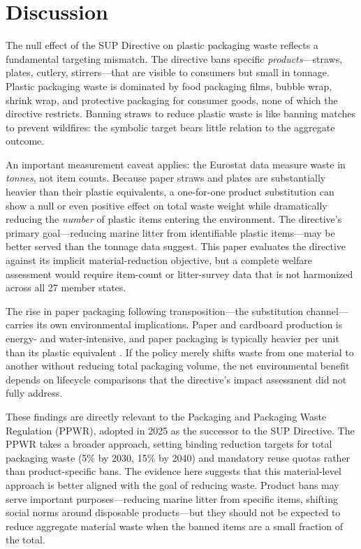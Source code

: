 \documentclass[12pt]{article}
\begin{document}



\section{Discussion}
\label{sec:discussion}

The null effect of the SUP Directive on plastic packaging waste reflects a fundamental targeting mismatch. The directive bans specific \textit{products}---straws, plates, cutlery, stirrers---that are visible to consumers but small in tonnage. Plastic packaging waste is dominated by food packaging films, bubble wrap, shrink wrap, and protective packaging for consumer goods, none of which the directive restricts. Banning straws to reduce plastic waste is like banning matches to prevent wildfires: the symbolic target bears little relation to the aggregate outcome.

An important measurement caveat applies: the Eurostat data measure waste in \textit{tonnes}, not item counts. Because paper straws and plates are substantially heavier than their plastic equivalents, a one-for-one product substitution can show a null or even positive effect on total waste weight while dramatically reducing the \textit{number} of plastic items entering the environment. The directive's primary goal---reducing marine litter from identifiable plastic items---may be better served than the tonnage data suggest. This paper evaluates the directive against its implicit material-reduction objective, but a complete welfare assessment would require item-count or litter-survey data that is not harmonized across all 27 member states.

The rise in paper packaging following transposition---the substitution channel---carries its own environmental implications. Paper and cardboard production is energy- and water-intensive, and paper packaging is typically heavier per unit than its plastic equivalent \citep{franklin2014environmental}. If the policy merely shifts waste from one material to another without reducing total packaging volume, the net environmental benefit depends on lifecycle comparisons that the directive's impact assessment did not fully address.

These findings are directly relevant to the Packaging and Packaging Waste Regulation (PPWR), adopted in 2025 as the successor to the SUP Directive. The PPWR takes a broader approach, setting binding reduction targets for total packaging waste (5\% by 2030, 15\% by 2040) and mandatory reuse quotas rather than product-specific bans. The evidence here suggests that this material-level approach is better aligned with the goal of reducing waste. Product bans may serve important purposes---reducing marine litter from specific items, shifting social norms around disposable products---but they should not be expected to reduce aggregate material waste when the banned items are a small fraction of the total.
\end{document}
